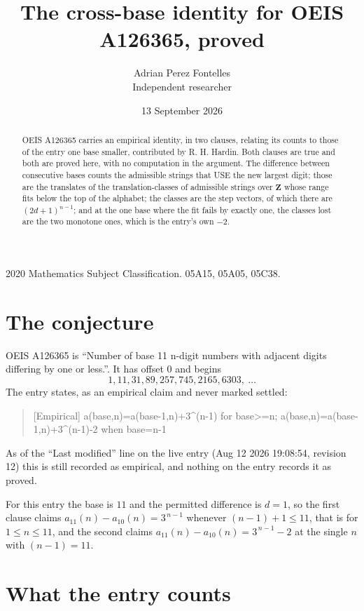 \documentclass[11pt,a4paper]{article}
\title{The cross-base identity for OEIS A126365, proved}
\author{Adrian Perez Fontelles\\ \small Independent researcher}
\date{13 September 2026}
\theoremstyle{plain}
\theoremstyle{definition}
\begin{document}
\maketitle

\begin{abstract}
OEIS A126365 carries an empirical identity, in two clauses, relating its counts to those of the
entry one base smaller, contributed by R. H. Hardin. Both clauses are true and both are proved
here, with no computation in the argument. The difference between consecutive bases counts the
admissible strings that USE the new largest digit; those are the translates of the
translation-classes of admissible strings over $\mathbf{Z}$ whose range fits below the top of
the alphabet; the classes are the step vectors, of which there are $(2d+1)^{n-1}$; and at the
one base where the fit fails by exactly one, the classes lost are the two monotone ones, which
is the entry's own $-2$.
\end{abstract}

\noindent\small 2020 Mathematics Subject Classification. 05A15, 05A05, 05C38.\normalsize

\section{The conjecture}

OEIS A126365 is ``Number of base 11 n-digit numbers with adjacent digits differing by one or less.''. It has offset $0$ and begins
\[
1, 11, 31, 89, 257, 745, 2165, 6303,\ \dots
\]
The entry states, as an empirical claim and never marked settled:
\begin{quote}
[Empirical] a(base,n)=a(base-1,n)+3\textasciicircum{}(n-1) for base>=n; a(base,n)=a(base-1,n)+3\textasciicircum{}(n-1)-2 when base=n-1
\end{quote}
As of the ``Last modified'' line on the live entry (Aug 12 2026 19:08:54, revision 12)
this is still recorded as empirical, and nothing on the entry records it as proved.

For this entry the base is $11$ and the permitted difference is $d=1$, so the first clause
claims $a_{11}(n)-a_{10}(n)=3^{\,n-1}$ whenever $(n-1)+1\le11$, that is for
$1\le n\le11$, and the second claims $a_{11}(n)-a_{10}(n)=3^{\,n-1}-2$ at the single
$n$ with $(n-1)=11$.

\section{What the entry counts}
\end{document}

